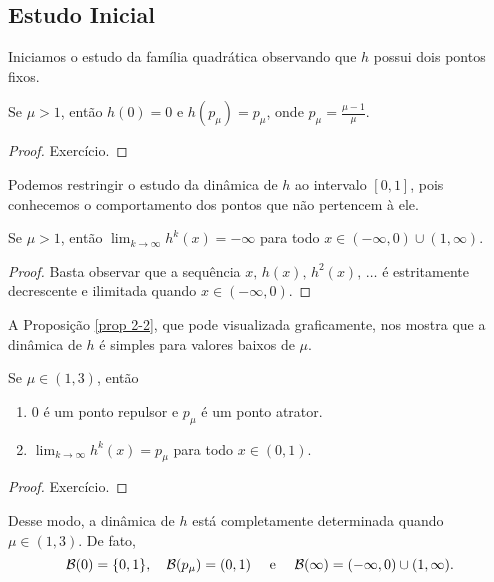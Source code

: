 \subsection{Estudo Inicial}

Iniciamos o estudo da família quadrática observando que $h$ possui dois pontos fixos.

\begin{proposition}
Se $\mu > 1$, então $h(0) = 0$ e $h(p_\mu) = p_\mu$, onde $p_\mu = \frac{\mu-1}{\mu}$.
\end{proposition}

\begin{proof}
Exercício.
\end{proof}

Podemos restringir o estudo da dinâmica de $h$ ao intervalo $[0, 1]$, pois conhecemos o comportamento dos pontos que não pertencem à ele.

\begin{proposition}\label{prop 2-1}
Se $\mu > 1$, então $\lim_{k \to \infty} h^k(x) = - \infty$ para todo $x \in (-\infty, 0) \cup (1, \infty)$.
\end{proposition}

\begin{proof}
Basta observar que a sequência $x, \, h(x), \, h^2(x), \, \dots$ é estritamente decrescente e ilimitada quando $x \in (-\infty, 0)$.
\end{proof}

A Proposição \ref{prop 2-2}, que pode visualizada graficamente, nos mostra que a dinâmica de $h$ é simples para valores baixos de $\mu$.

\begin{proposition}\label{prop 2-2}
Se $\mu \in (1, 3)$, então
\begin{enumerate}
\item $0$ é um ponto repulsor e $p_\mu$ é um ponto atrator.
\item $\lim_{k \to \infty} h^k(x) = p_\mu$ para todo $x \in (0, 1)$.
\end{enumerate}
\end{proposition}

\begin{proof}
Exercício.
\end{proof}

Desse modo, a dinâmica de $h$ está completamente determinada quando $\mu \in (1, 3)$. De fato,
$$\mathcal{B}(0) = \lbrace 0, 1 \rbrace, \quad \mathcal{B}(p_\mu) = (0, 1) \quad \text{ e }  \quad \mathcal{B}(\infty) = (-\infty, 0) \cup (1, \infty).$$
